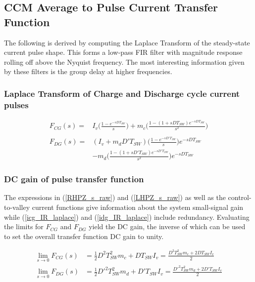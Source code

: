 \documentclass{scrartcl}
\begin{document}
		\subsection{CCM Average to Pulse Current Transfer Function}	
		The following is derived by computing the Laplace Transform of the steady-state current pulse shape.  This forms a low-pass FIR filter with magnitude response rolling off above the Nyquist frequency.  The most interesting information given by these filters is the group delay at higher frequencies.
		
		\subsubsection{Laplace Transform of Charge and Discharge cycle current pulses}	
		
		\begin{align}
		F_{CG}(s) =&   I_{v} \bigg( \frac{1 - e^{-sDT_{SW}}}{s} \bigg)
		+ m_c\bigg( \frac{1 - (1 + sDT_{SW})e^{-sDT_{SW}}}{s^2} \bigg)
		\label{icg_IR_laplace} \\
		\nonumber\\
		F_{DG}(s) =& (I_{v} +m_d D'T_{SW}) \bigg( \frac{1 - e^{-sD'T_{SW}}}{s} \bigg)  e^{-sDT_{SW}}\nonumber\\
		&- m_d \bigg( \frac{1 - (1 + sD'T_{SW})e^{-sD'T_{SW}}}{s^2} \bigg)  e^{-sDT_{SW}}
		\label{idg_IR_laplace}
		\end{align}
		
		\subsubsection{DC gain of pulse transfer function}
		The expressions in (\ref{RHPZ_s_raw}) and (\ref{LHPZ_s_raw}) as well as the control-to-valley current functions give information about the system small-signal gain while (\ref{icg_IR_laplace}) and (\ref{idg_IR_laplace}) include redundancy. Evaluating the limits for $F_{CG}$ and $F_{DG}$ yield the DC gain, the inverse of which can be used to set the overall transfer function DC gain to unity.
		
		\begin{align}
		\lim_{s \to 0} F_{CG}(s) &= \frac{1}{2} D^2 T_{SW}^2m_c + D T_{SW} I_v = \frac{D^2 T_{SW}^2m_c + 2D T_{SW} I_v}{2} \label{lim_FCG} \\
		\lim_{s \to 0} F_{DG}(s) &= \frac{1}{2} D'^2 T_{SW}^2m_d + D' T_{SW} I_v= \frac{D'^2 T_{SW}^2m_d + 2D' T_{SW} I_v}{2} \label{lim_FDG}
		\end{align}
		
\end{document}

